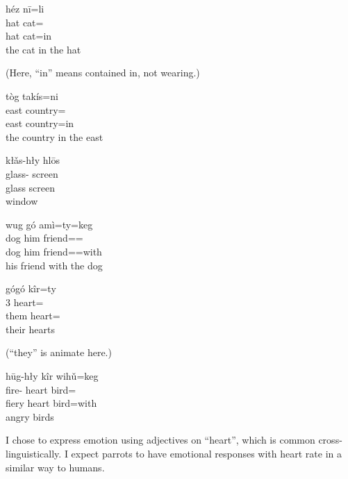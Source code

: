 \documentclass[12pt]{article}
\begin{document}
    \begin{exe}
        \ex
        \glll
        héz nī=li \\
        hat cat=\InessThree{} \\
        hat cat=in \\
        \glt
        the cat in the hat
    \end{exe}
    (Here, ``in'' means contained in, not wearing.)

    \begin{exe}
        \ex
        \glll
        tòg takís=ni \\
        east country=\InessTwo{} \\
        east country=in \\
        \glt
        the country in the east
    \end{exe}

    \begin{exe}
        \ex
        \glll
        kłǎs-hły hlōs \\
        glass-\Adj{} screen \\
        glass screen \\
        \glt
        window
    \end{exe}

    \begin{exe}
        \ex
        \glll
        wug gó amì=ty=keg \\
        dog him friend=\Poss{}=\Com{} \\
        dog him friend=\Poss{}=with \\
        \glt
        his friend with the dog
    \end{exe}

    \begin{exe}
        \ex
        \glll
        gógó kîr=ty \\
        3\Pl{} heart=\Poss{} \\
        them heart=\Poss{} \\
        \glt
        their hearts
    \end{exe}
    (``they'' is animate here.)

    \begin{exe}
        \ex
        \glll
        hūg-hły kîr wihǔ=keg \\
        fire-\Adj{} heart bird=\Com{} \\
        fiery heart bird=with \\
        \glt
        angry birds
    \end{exe}
    I chose to express emotion using adjectives on ``heart'',
    which is common cross-linguistically.
    I expect parrots to have emotional responses with heart rate
    in a similar way to humans.
\end{document}
